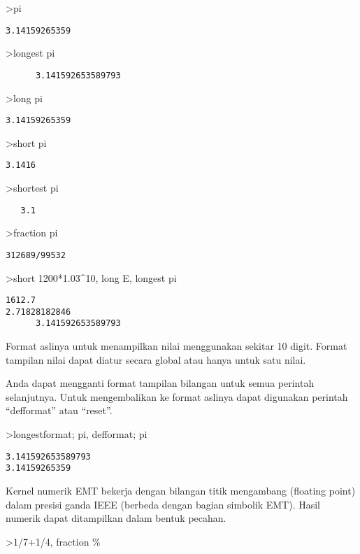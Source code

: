 \documentclass[
]{book}
\begin{document}
\textgreater pi

\begin{verbatim}
3.14159265359
\end{verbatim}

\textgreater longest pi

\begin{verbatim}
      3.141592653589793 
\end{verbatim}

\textgreater long pi

\begin{verbatim}
3.14159265359
\end{verbatim}

\textgreater short pi

\begin{verbatim}
3.1416
\end{verbatim}

\textgreater shortest pi

\begin{verbatim}
   3.1 
\end{verbatim}

\textgreater fraction pi

\begin{verbatim}
312689/99532
\end{verbatim}

\textgreater short 1200*1.03\^{}10, long E, longest pi

\begin{verbatim}
1612.7
2.71828182846
      3.141592653589793 
\end{verbatim}

Format aslinya untuk menampilkan nilai menggunakan sekitar 10 digit. Format tampilan nilai dapat diatur secara global atau hanya untuk satu nilai.

Anda dapat mengganti format tampilan bilangan untuk semua perintah selanjutnya. Untuk mengembalikan ke format aslinya dapat digunakan perintah ``defformat'' atau ``reset''.

\textgreater longestformat; pi, defformat; pi

\begin{verbatim}
3.141592653589793
3.14159265359
\end{verbatim}

Kernel numerik EMT bekerja dengan bilangan titik mengambang (floating point) dalam presisi ganda IEEE (berbeda dengan bagian simbolik EMT). Hasil numerik dapat ditampilkan dalam bentuk pecahan.

\textgreater1/7+1/4, fraction \%
\end{document}
